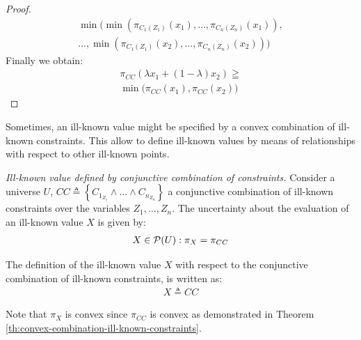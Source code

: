 \begin{proof}
\begin{align}
\nonumber
\min \big( \min \left(\pi_{C_1(Z_1)} \left( x_1 \right), \ldots, \pi_{C_n(Z_n)} \left( x_1 \right) \right),\\
\nonumber
\ldots, \min \left(\pi_{C_1(Z_1)} \left( x_2 \right), \ldots, \pi_{C_n(Z_n)} \left( x_2 \right) \right) \big)
\end{align}
Finally we obtain:
\begin{align}
\label{eq:proof-convex5}
\pi_{CC} \left( \lambda x_1 + \left( 1 - \lambda \right)x_2 \right) \geqq  \\
\nonumber
\min \big(\pi_{CC} \left( x_1 \right), \pi_{CC} \left( x_2 \right) \big)
\end{align}
\end{proof}

Sometimes, an ill-known value might be specified by a convex combination of ill-known constraints. This allow to define ill-known values by means of relationships with respect to other ill-known points.


\begin{definition}
\label{def:convex-combination-ill-known-constraints}
\emph{Ill-known value defined by conjunctive combination of constraints.}
Consider a universe $U$, $CC \triangleq \left \lbrace C_{1_{Z_1}} \wedge \ldots \wedge C_{n_{Z_n}}  \right \rbrace$ a conjunctive combination of ill-known constraints over the variables $Z_1, \ldots, Z_n$. The uncertainty about the evaluation of an ill-known value $X$ is given by:
\begin{align}
\label{eq:ill-known-value-def-by-const-unc}
X \in \mathcal{P}(U):\pi_{X}=\pi_{CC}
\end{align} 

The definition of the ill-known value $X$ with respect to the conjunctive combination of ill-known constraints, is written as:
\begin{align}
\label{eq:ill-known-value-by-convex-constraints}
X \triangleq CC 
\end{align}


Note that $\pi_{X}$ is convex since $\pi_{CC}$ is convex as demonstrated in Theorem \ref{th:convex-combination-ill-known-constraints}.
\end{definition}


